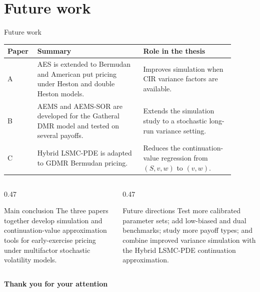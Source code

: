 \section{Future work}

\begin{frame}{Future work}
  \scriptsize
  \begin{tabular}{p{0.10\linewidth}p{0.43\linewidth}p{0.37\linewidth}}
    \toprule
    Paper & Summary & Role in the thesis \\
    \midrule
    A & AES is extended to Bermudan and American put pricing under Heston and double Heston models. & Improves simulation when CIR variance factors are available. \\
    B & AEMS and AEMS-SOR are developed for the Gatheral DMR model and tested on several payoffs. & Extends the simulation study to a stochastic long-run variance setting. \\
    C & Hybrid LSMC-PDE is adapted to GDMR Bermudan pricing. & Reduces the continuation-value regression from \((S,v,w)\) to \((v,w)\). \\
    \bottomrule
  \end{tabular}

  \vspace{0.8em}
  \begin{columns}[T,onlytextwidth]
    \begin{column}{0.47\textwidth}
      \begin{block}{Main conclusion}
        \scriptsize The three papers together develop simulation and continuation-value approximation tools for early-exercise pricing under multifactor stochastic volatility models.
      \end{block}
    \end{column}
    \begin{column}{0.47\textwidth}
      \begin{block}{Future directions}
        \scriptsize Test more calibrated parameter sets; add low-biased and dual benchmarks; study more payoff types; and combine improved variance simulation with the Hybrid LSMC-PDE continuation approximation.
      \end{block}
    \end{column}
  \end{columns}
\end{frame}

\begin{frame}
  \centering
  \vfill
  {\Large\bfseries Thank you for your attention}
  \vfill
\end{frame}
